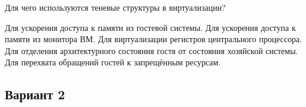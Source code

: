 \begin{questions}
\question[3] Для чего используются теневые структуры в виртуализации?
\begin{choices}
    \choice Для ускорения доступа к памяти из гостевой системы.
    \choice Для ускорения доступа к памяти из монитора ВМ.
    \choice Для виртуализации регистров центрального процессора.
    \correctchoice Для отделения архитектурного состояния гостя от состояния хозяйской системы.
    \choice Для перехвата обращений гостей к запрещённым ресурсам.
\end{choices}


\end{questions}

\subsection*{Вариант 2}

